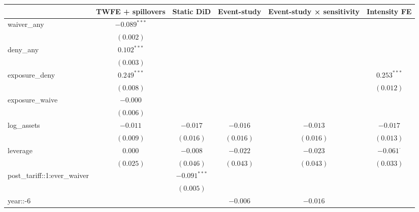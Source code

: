 
\begin{table}
\begin{center}
\begin{tabular}{l c c c c c}
\hline
 & TWFE + spillovers & Static DiD & Event-study & Event-study × sensitivity & Intensity FE \\
\hline
waiver\_any                  & $-0.089^{***}$ &                &                &                  &                  \\
                             & $(0.002)$      &                &                &                  &                  \\
deny\_any                    & $0.102^{***}$  &                &                &                  &                  \\
                             & $(0.003)$      &                &                &                  &                  \\
exposure\_deny               & $0.249^{***}$  &                &                &                  & $0.253^{***}$    \\
                             & $(0.008)$      &                &                &                  & $(0.012)$        \\
exposure\_waive              & $-0.000$       &                &                &                  &                  \\
                             & $(0.006)$      &                &                &                  &                  \\
log\_assets                  & $-0.011$       & $-0.017$       & $-0.016$       & $-0.013$         & $-0.017$         \\
                             & $(0.009)$      & $(0.016)$      & $(0.016)$      & $(0.016)$        & $(0.013)$        \\
leverage                     & $0.000$        & $-0.008$       & $-0.022$       & $-0.023$         & $-0.061^{\cdot}$ \\
                             & $(0.025)$      & $(0.046)$      & $(0.043)$      & $(0.043)$        & $(0.033)$        \\
post\_tariff::1:ever\_waiver &                & $-0.091^{***}$ &                &                  &                  \\
                             &                & $(0.005)$      &                &                  &                  \\
year::-6                     &                &                & $-0.006$       & $-0.016$         &                  \\

\end{tabular}
\end{center}
\end{table}
